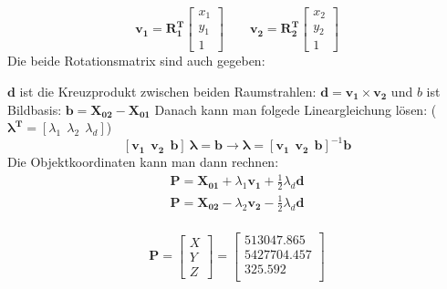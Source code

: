 \documentclass[12pt]{article}
\begin{document}
\begin{equation*}
\bm{v_1} = \bm{R_1^T} \begin{bmatrix}
x_1 \\
y_1 \\
1 
\end{bmatrix} \qquad \bm{v_2} = \bm{R_2^T} \begin{bmatrix}
x_2 \\
y_2 \\
1 
\end{bmatrix}
\end{equation*}
Die beide Rotationsmatrix sind auch gegeben: 
\begin{figure}[ht]\centering
\end{figure}
\newline
$\bm{d}$ ist die Kreuzprodukt zwischen beiden Raumstrahlen: $\bm{d} =\bm{v_1} \times \bm{v_2}$ und $b$ ist Bildbasis: $\bm{b} = \bm{X_{02}} - \bm{X_{01}}$ \newline
Danach kann man folgede Lineargleichung lösen: ($\bm{\lambda^T} = [\lambda_1\ \ \lambda_2 \ \ \lambda_d]$)
\begin{equation*}
\left[\bm{v_1}\ \ \bm{v_2}\ \ \bm{b}\right] \ \bm{\lambda} = \bm{b} \longrightarrow \bm{\lambda} = \left[\bm{v_1}\ \ \bm{v_2}\ \ \bm{b}\right]^{-1} \bm{b}
\end{equation*}
Die Objektkoordinaten kann man dann rechnen:
\begin{gather*}
\bm{P} = \bm{X_{01}} + \lambda_1 \bm{v_1} + \frac{1}{2} \lambda_d \bm{d} \\
\bm{P} = \bm{X_{02}} - \lambda_2 \bm{v_2} - \frac{1}{2} \lambda_d \bm{d} \\
\end{gather*}
\begin{figure}[ht]\centering
\end{figure}
\newpage
\begin{equation*}
\bm{P} = \begin{bmatrix}
X \\
Y \\
Z
\end{bmatrix} = \begin{bmatrix}
513047.865 \\
5427704.457\\
325.592\\
\end{bmatrix}
\end{equation*}
\end{document}
